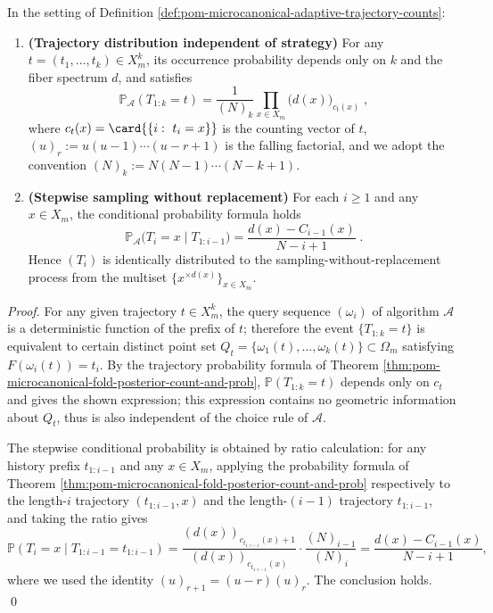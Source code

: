 \begin{theorem}\label{thm:pom-microcanonical-adaptive-no-gain-without-replacement}
In the setting of Definition \ref{def:pom-microcanonical-adaptive-trajectory-counts}:
\begin{enumerate}
  \item \textbf{(Trajectory distribution independent of strategy)}
  For any \(t=(t_1,\dots,t_k)\in X_m^k\), its occurrence probability depends only on \(k\) and the fiber spectrum \(d\), and satisfies
  \[
  \boxed{\;
  \mathbb{P}_{\mathcal{A}}(T_{1:k}=t)
  =\frac{1}{(N)_k}\prod_{x\in X_m}\bigl(d(x)\bigr)_{c_t(x)}\;},
  \]
  where \(c_t(x)=\card{\{i:\ t_i=x\}}\) is the counting vector of \(t\), \((u)_r:=u(u-1)\cdots(u-r+1)\) is the falling factorial,
  and we adopt the convention \((N)_k:=N(N-1)\cdots(N-k+1)\).
  \item \textbf{(Stepwise sampling without replacement)}
  For each \(i\ge 1\) and any \(x\in X_m\), the conditional probability formula holds
  \[
  \boxed{\;
  \mathbb{P}_{\mathcal{A}}\!\bigl(T_i=x\mid T_{1:i-1}\bigr)
  =\frac{d(x)-C_{i-1}(x)}{N-i+1}\; } .
  \]
  Hence \((T_i)\) is identically distributed to the sampling-without-replacement process from the multiset \(\{x^{\times d(x)}\}_{x\in X_m}\).
\end{enumerate}
\end{theorem}
\begin{proof}
For any given trajectory \(t\in X_m^k\), the query sequence \((\omega_i)\) of algorithm \(\mathcal{A}\) is a deterministic function of the prefix of \(t\);
therefore the event \(\{T_{1:k}=t\}\) is equivalent to certain distinct point set \(Q_t=\{\omega_1(t),\dots,\omega_k(t)\}\subset\Omega_m\) satisfying
\(
F(\omega_i(t))=t_i
\).
By the trajectory probability formula of Theorem \ref{thm:pom-microcanonical-fold-posterior-count-and-prob},
\(\mathbb{P}(T_{1:k}=t)\) depends only on \(c_t\) and gives the shown expression; this expression contains no geometric information about \(Q_t\), thus is also independent of the choice rule of \(\mathcal{A}\).
\par
The stepwise conditional probability is obtained by ratio calculation: for any history prefix \(t_{1:i-1}\) and any \(x\in X_m\),
applying the probability formula of Theorem \ref{thm:pom-microcanonical-fold-posterior-count-and-prob} respectively to the length-\(i\) trajectory \((t_{1:i-1},x)\) and the length-\((i-1)\) trajectory \(t_{1:i-1}\), and taking the ratio gives
\[
\mathbb{P}(T_i=x\mid T_{1:i-1}=t_{1:i-1})
=\frac{(d(x))_{c_{t_{1:i-1}}(x)+1}}{(d(x))_{c_{t_{1:i-1}}(x)}}\cdot\frac{(N)_{i-1}}{(N)_{i}}
=\frac{d(x)-C_{i-1}(x)}{N-i+1},
\]
where we used the identity \((u)_{r+1}=(u-r)(u)_r\).
The conclusion holds. \qed
\end{proof}

